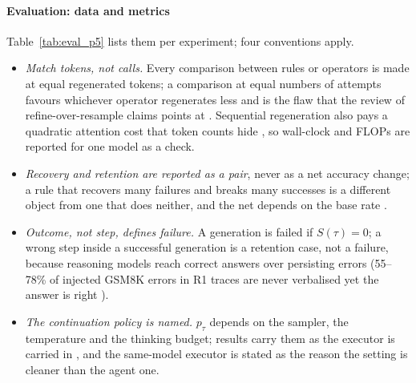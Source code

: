 \documentclass[10pt,a4paper]{article}
\begin{document}
\paragraph{Evaluation: data and metrics} Table~\ref{tab:eval_p5} lists them per experiment; four conventions apply.
\begin{itemize}[leftmargin=1.1em]
\item \emph{Match tokens, not calls.} Every comparison between rules or operators is made at equal regenerated tokens; a comparison at equal numbers of attempts favours whichever operator regenerates less and is the flaw that the review of refine-over-resample claims points at \cite{verma2026tryagain}. Sequential regeneration also pays a quadratic attention cost that token counts hide \cite{qin2025backtrack}, so wall-clock and FLOPs are reported for one model as a check.
\item \emph{Recovery and retention are reported as a pair}, never as a net accuracy change; a rule that recovers many failures and breaks many successes is a different object from one that does neither, and the net depends on the base rate \cite{zhang2026riskaware}.
\item \emph{Outcome, not step, defines failure.} A generation is failed if $S(\tau)=0$; a wrong step inside a successful generation is a retention case, not a failure, because reasoning models reach correct answers over persisting errors (55--78\% of injected GSM8K errors in R1 traces are never verbalised yet the answer is right \cite{phan2026critique}).
\item \emph{The continuation policy is named.} $p_\tau$ depends on the sampler, the temperature and the thinking budget; results carry them as the executor is carried in \citet{liao2026repairs}, and the same-model executor is stated as the reason the setting is cleaner than the agent one.
\end{itemize}
\end{document}
